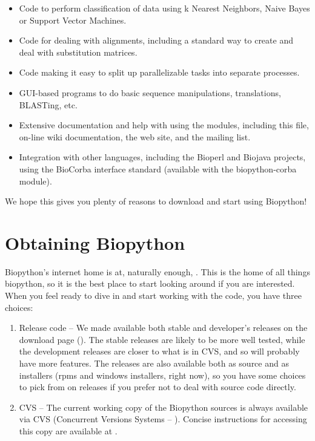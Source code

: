 \documentclass{report}
\begin{document}
\begin{itemize}
  \item Code to perform classification of data using k Nearest Neighbors, Naive Bayes or Support Vector Machines.

  \item Code for dealing with alignments, including a standard way to create and deal with substitution matrices.

  \item Code making it easy to split up parallelizable tasks into separate processes.

  \item GUI-based programs to do basic sequence manipulations, translations, BLASTing, etc.

  \item Extensive documentation and help with using the modules, including this file, on-line wiki documentation, the web site, and the mailing list.

  \item Integration with other languages, including the Bioperl and Biojava projects, using the BioCorba interface standard (available with the biopython-corba module).

\end{itemize}

We hope this gives you plenty of reasons to download and start using Biopython!

\section{Obtaining Biopython}

Biopython's internet home is at, naturally enough,  . This is the home of all things biopython, so it is the best place to start looking around if you are interested. When you feel ready to dive in and start working with the code, you have three choices:

\begin{enumerate}

\item Release code -- We made available both stable and developer's releases on the download page (). The stable releases are likely to be more well tested, while the development releases are closer to what is in CVS, and so will probably have more features. The releases are also available both as source and as installers (rpms and windows installers, right now), so you have some choices to pick from on releases if you prefer not to deal with source code directly.

\item CVS -- The current working copy of the Biopython sources is always available via CVS (Concurrent Versions Systems -- ). Concise instructions for accessing this copy are available at .

\end{enumerate}
\end{document}
